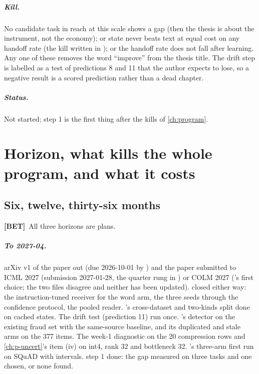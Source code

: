 \documentclass[11pt,a4paper]{report}
\newcommand{\BET}{\textcolor{betc}{\textbf{\scriptsize[BET]}}}
\begin{document}
\paragraph{Kill.} No candidate task in reach at this scale shows a gap (then the thesis is about the instrument, not the economy); or state never beats text at equal cost on any handoff rate (the kill written in ); or the handoff rate does not fall after learning. Any one of these removes the word ``improve'' from the thesis title. The drift step is labelled as a test of predictions 8 and 11 that the author expects to lose, so a negative result is a scored prediction rather than a dead chapter.

\paragraph{Status.} Not started; step 1 is the first thing after the kills of \cref{ch:program}.

\chapter{Horizon, what kills the whole program, and what it costs}
\label{ch:horizon}

\section{Six, twelve, thirty-six months}

\BET\ All three horizons are plans.

\paragraph{To 2027-04.} arXiv v1 of the paper out (due 2026-10-01 by ) and the paper submitted to ICML 2027 (submission 2027-01-28, the quarter rung in ) or COLM 2027 ('s first choice; the two files disagree and neither has been updated).  closed either way: the instruction-tuned receiver for the word arm, the three seeds through the confidence protocol, the pooled reader. 's cross-dataset and two-kinds split done on cached states. The drift test (prediction 11) run once. 's detector on the existing fraud set with the same-source baseline, and its duplicated and stale arms on the 377 items. The week-1 diagnostic on the 20 compression rows and \cref{ch:p-uncert}'s item (iv) on int4, rank 32 and bottleneck 32. 's three-arm first run on SQuAD with intervals.  step 1 done: the gap measured on three tasks and one chosen, or none found.
\end{document}
